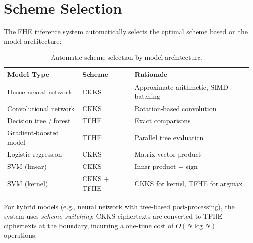 \section{Scheme Selection}

\label{sec:schemes}

The FHE inference system automatically selects the optimal scheme based on the
model architecture:

\begin{table}[H]
\centering
\small
\begin{tabular}{lll}
\toprule
\textbf{Model Type} & \textbf{Scheme} & \textbf{Rationale} \\
\midrule
Dense neural network & CKKS & Approximate arithmetic, SIMD batching \\
Convolutional network & CKKS & Rotation-based convolution \\
Decision tree / forest & TFHE & Exact comparisons \\
Gradient-boosted model & TFHE & Parallel tree evaluation \\
Logistic regression & CKKS & Matrix-vector product \\
SVM (linear) & CKKS & Inner product + sign \\
SVM (kernel) & CKKS + TFHE & CKKS for kernel, TFHE for argmax \\
\bottomrule
\end{tabular}
\caption{Automatic scheme selection by model architecture.}
\label{tab:scheme}
\end{table}

For hybrid models (e.g., neural network with tree-based post-processing), the
system uses \emph{scheme switching}: CKKS ciphertexts are converted to TFHE
ciphertexts at the boundary, incurring a one-time cost of $O(N \log N)$
operations.

